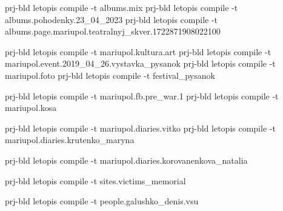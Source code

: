  
 
 
 
 


prj-bld letopis compile -t albums.mix
prj-bld letopis compile -t albums.pohodenky.23_04_2023
prj-bld letopis compile -t albums.page.mariupol.teatralnyj_skver.1722871908022100

prj-bld letopis compile -t mariupol.kultura.art
prj-bld letopis compile -t mariupol.event.2019_04_26.vystavka_pysanok
prj-bld letopis compile -t mariupol.foto
prj-bld letopis compile -t festival_pysanok

prj-bld letopis compile -t mariupol.fb.pre_war.1
prj-bld letopis compile -t mariupol.kosa

prj-bld letopis compile -t mariupol.diaries.vitko
prj-bld letopis compile -t mariupol.diaries.krutenko_maryna

prj-bld letopis compile -t mariupol.diaries.korovanenkova_natalia

prj-bld letopis compile -t sites.victims_memorial

prj-bld letopis compile -t people.galushko_denis.vsu

